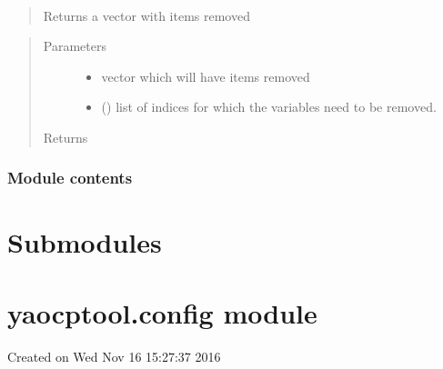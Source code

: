 \documentclass[letterpaper,10pt,english]{sphinxmanual}
\begin{document}
\begin{fulllineitems}
\label{\detokenize{yaocptool.util:yaocptool.util.util.remove_variables_from_vector_by_indices}}~\begin{quote}

Returns a vector with items removed
\end{quote}
\begin{quote}\begin{description}
\item[{Parameters}] \leavevmode\begin{itemize}
\item {} 
 \textendash{} vector which will have items removed

\item {} 
 () \textendash{} list of indices for which the variables need to be removed.

\end{itemize}

\item[{Returns}] \leavevmode


\end{description}\end{quote}

\end{fulllineitems}



\subsubsection{Module contents}
\label{\detokenize{yaocptool.util:module-yaocptool.util}}\label{\detokenize{yaocptool.util:module-contents}}

\section{Submodules}
\label{\detokenize{yaocptool:submodules}}

\section{yaocptool.config module}
\label{\detokenize{yaocptool:module-yaocptool.config}}\label{\detokenize{yaocptool:yaocptool-config-module}}
Created on Wed Nov 16 15:27:37 2016
\end{document}
